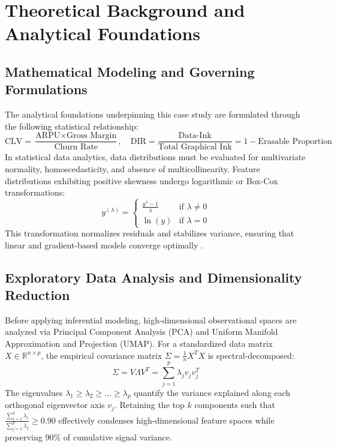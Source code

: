 \section{Theoretical Background and Analytical Foundations}

\subsection{Mathematical Modeling and Governing Formulations}
The analytical foundations underpinning this case study are formulated through the following statistical relationship:
\begin{equation}
  \text{CLV} = \frac{\text{ARPU} \times \text{Gross Margin}}{\text{Churn Rate}}, \quad \text{DIR} = \frac{\text{Data-Ink}}{\text{Total Graphical Ink}} = 1 - \text{Erasable Proportion}
\label{eq:core_math}
\end{equation}
In statistical data analytics, data distributions must be evaluated for multivariate normality, homoscedasticity, and absence of multicollinearity. Feature distributions exhibiting positive skewness undergo logarithmic or Box-Cox transformations:
\begin{equation}
  y^{(\lambda)} = \begin{cases} \frac{y^\lambda - 1}{\lambda} & \text{if } \lambda \neq 0 \\ \ln(y) & \text{if } \lambda = 0 \end{cases}
\end{equation}
This transformation normalizes residuals and stabilizes variance, ensuring that linear and gradient-based models converge optimally \cite{wickham2016r}.

\subsection{Exploratory Data Analysis and Dimensionality Reduction}
Before applying inferential modeling, high-dimensional observational spaces are analyzed via Principal Component Analysis (PCA) and Uniform Manifold Approximation and Projection (UMAP). For a standardized data matrix $X \in \mathbb{R}^{n \times p}$, the empirical covariance matrix $\Sigma = \frac{1}{n} X^T X$ is spectral-decomposed:
\begin{equation}
  \Sigma = V \Lambda V^T = \sum_{j=1}^p \lambda_j v_j v_j^T
\end{equation}
The eigenvalues $\lambda_1 \ge \lambda_2 \ge \dots \ge \lambda_p$ quantify the variance explained along each orthogonal eigenvector axis $v_j$. Retaining the top $k$ components such that $\frac{\sum_{i=1}^k \lambda_i}{\sum_{j=1}^p \lambda_j} \ge 0.90$ effectively condenses high-dimensional feature spaces while preserving $90\%$ of cumulative signal variance.

